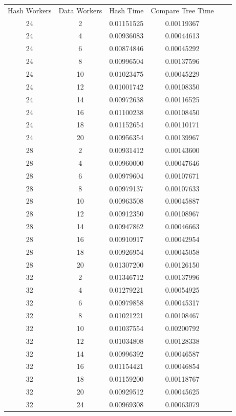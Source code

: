 \documentclass[letterpaper,12pt]{article}
\theoremstyle{remark}
\begin{document}
\begin{tabular}{cccccc}

Hash Workers & Data Workers & Hash Time & Compare Tree Time \\

24 & 2 & 0.01151525 & 0.00119367 \\
24 & 4 & 0.00936083 & 0.00044613 \\
24 & 6 & 0.00874846 & 0.00045292 \\
24 & 8 & 0.00996504 & 0.00137596 \\
24 & 10 & 0.01023475 & 0.00045229 \\
24 & 12 & 0.01001742 & 0.00108350 \\
24 & 14 & 0.00972638 & 0.00116525 \\
24 & 16 & 0.01100238 & 0.00108450 \\
24 & 18 & 0.01152654 & 0.00110171 \\
24 & 20 & 0.00956354 & 0.00139967 \\
28 & 2 & 0.00931412 & 0.00143600 \\
28 & 4 & 0.00960000 & 0.00047646 \\
28 & 6 & 0.00979604 & 0.00107671 \\
28 & 8 & 0.00979137 & 0.00107633 \\
28 & 10 & 0.00963508 & 0.00045887 \\
28 & 12 & 0.00912350 & 0.00108967 \\
28 & 14 & 0.00947862 & 0.00046663 \\
28 & 16 & 0.00910917 & 0.00042954 \\
28 & 18 & 0.00926954 & 0.00045058 \\
28 & 20 & 0.01307200 & 0.00126150 \\
32 & 2 & 0.01346712 & 0.00137996 \\
32 & 4 & 0.01279221 & 0.00054925 \\
32 & 6 & 0.00979858 & 0.00045317 \\
32 & 8 & 0.01021221 & 0.00108467 \\
32 & 10 & 0.01037554 & 0.00200792 \\
32 & 12 & 0.01034808 & 0.00128338 \\
32 & 14 & 0.00996392 & 0.00046587 \\
32 & 16 & 0.01154421 & 0.00046854 \\
32 & 18 & 0.01159200 & 0.00118767 \\
32 & 20 & 0.00929512 & 0.00045625 \\
32 & 24 & 0.00969308 & 0.00063079 \\

\end{tabular}
\end{document}
